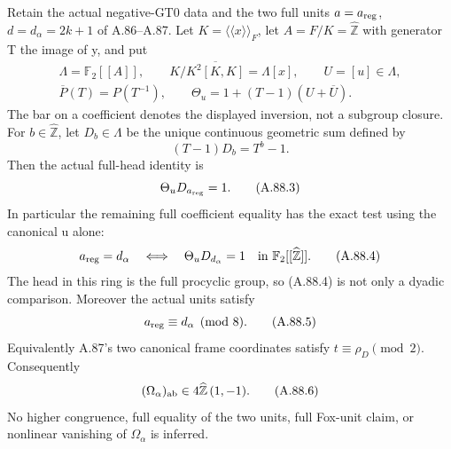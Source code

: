Retain the actual negative-GT0 data and the two full units
\(a=a_{\rm reg}\), \(d=d_\alpha=2k+1\) of A.86--A.87.
Let \(K=\langle\!\langle x\rangle\!\rangle_F\), let
\(A=F/K=\widehat{\mathbb Z}\) with generator T the image of y, and put
\[
 \begin{gathered}
 \Lambda=\mathbb F_2[[A]],\qquad
 K/\overline{K^2[K,K]}=\Lambda[x],\qquad U=[u]\in\Lambda,\\
 \overline P(T)=P(T^{-1}),\qquad
 \Theta_u=1+(T-1)(U+\overline U).
 \end{gathered}
 \tag{A.88.1}
\]
The bar on a coefficient denotes the displayed inversion, not a
subgroup closure. For \(b\in\widehat{\mathbb Z}\), let \(D_b\in\Lambda\)
be the unique continuous geometric sum defined by
\[
                         (T-1)D_b=T^b-1.
 \tag{A.88.2}
\]
Then the actual full-head identity is
\[
             \Theta_uD_{a_{\rm reg}}=1.
 \tag{A.88.3}
\]
In particular the remaining full coefficient equality has the exact
test using the canonical u alone:
\[
              a_{\rm reg}=d_\alpha
              \quad\Longleftrightarrow\quad\Theta_uD_{d_\alpha}=1
              \quad\hbox{in }\mathbb F_2[[\widehat{\mathbb Z}]].
 \tag{A.88.4}
\]
The head in this ring is the full procyclic group, so (A.88.4) is
not only a dyadic comparison. Moreover the actual units satisfy
\[
                         a_{\rm reg}\equiv d_\alpha\pmod 8.
 \tag{A.88.5}
\]
Equivalently A.87's two canonical frame coordinates satisfy
\(t\equiv\rho_D\pmod2\). Consequently
\[
           (\Omega_\alpha)_{\rm ab}
              \in4\widehat{\mathbb Z}\,(1,-1).
 \tag{A.88.6}
\]
No higher congruence, full equality of the two units, full Fox-unit
claim, or nonlinear vanishing of \(\Omega_\alpha\) is inferred.

